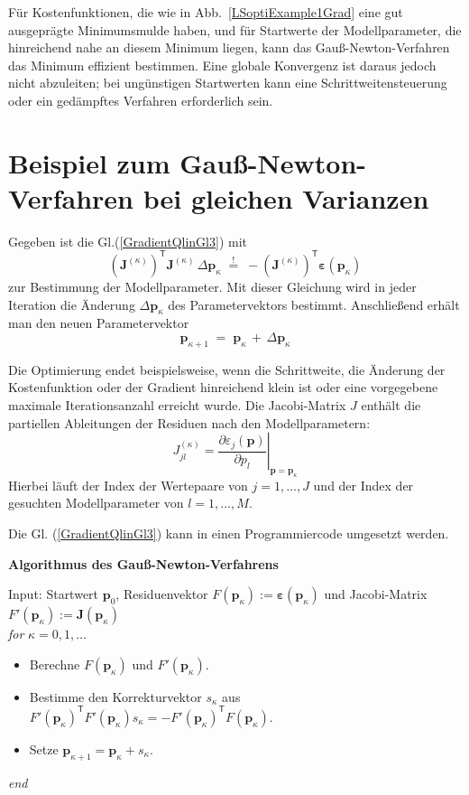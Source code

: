 Für Kostenfunktionen, die wie in Abb.~\ref{LSoptiExample1Grad} eine gut ausgeprägte
Minimumsmulde haben, und für Startwerte der Modellparameter, die hinreichend nahe an
diesem Minimum liegen, kann das Gauß-Newton-Verfahren das Minimum effizient bestimmen.
Eine globale Konvergenz ist daraus jedoch nicht abzuleiten; bei ungünstigen Startwerten
kann eine Schrittweitensteuerung oder ein gedämpftes Verfahren erforderlich sein.
\section{Beispiel zum Gauß-Newton-Verfahren bei gleichen Varianzen}

Gegeben ist die Gl.(\ref{GradientQlinGl3}) mit
$$
 \left(\boldsymbol{J}^{(\kappa)}\right)^\mathsf{T}
 \boldsymbol{J}^{(\kappa)} \, \Delta \mathbf{p}_\kappa
\; \overset{!}{=} \;
-\left(\boldsymbol{J}^{(\kappa)}\right)^\mathsf{T}
\boldsymbol{\varepsilon}(\mathbf{p}_\kappa)
$$
zur Bestimmung der Modellparameter. Mit dieser Gleichung wird in jeder Iteration
die Änderung $\Delta \mathbf{p}_\kappa$ des Parametervektors bestimmt. Anschließend
erhält man den neuen Parametervektor
$$
\mathbf{p}_{\kappa+1} \; = \; \mathbf{p}_{\kappa} \, + \,
\Delta \mathbf{p}_{\kappa}
$$

Die Optimierung endet beispielsweise, wenn die Schrittweite, die Änderung der
Kostenfunktion oder der Gradient hinreichend klein ist oder eine vorgegebene
maximale Iterationsanzahl erreicht wurde. Die Jacobi-Matrix $J$ enthält die
partiellen Ableitungen der Residuen nach den Modellparametern:
$$ 
J_{jl}^{(\kappa)}
=\left.\frac{\partial \varepsilon_j(\boldsymbol p)}
{\partial p_l}\right|_{\boldsymbol p=\boldsymbol p_\kappa}
$$
Hierbei läuft der Index der Wertepaare von $j=1,\ldots,J$  und der Index
der gesuchten Modellparameter von $l=1,\ldots,M$.

Die Gl. (\ref{GradientQlinGl3}) kann in einen Programmiercode
umgesetzt werden.

\textbf{Algorithmus des Gauß-Newton-Verfahrens}

Input: Startwert $\boldsymbol p_0$, Residuenvektor
$F(\boldsymbol p_\kappa):=\boldsymbol\varepsilon(\boldsymbol p_\kappa)$ und
Jacobi-Matrix $F'(\boldsymbol p_\kappa):=\boldsymbol J(\boldsymbol p_\kappa)$ \\
\hspace*{1em}\textit{for} $\kappa = 0,1, \ldots$ \\[-3ex]
\begin{itemize}
	\item[i)] Berechne $F(\boldsymbol p_\kappa)$ und $F'(\boldsymbol p_\kappa)$.
	\item[ii)] Bestimme den Korrekturvektor $s_\kappa$ aus
	$F'(\boldsymbol p_\kappa)^\mathsf{T}F'(\boldsymbol p_\kappa)s_\kappa
	= -F'(\boldsymbol p_\kappa)^\mathsf{T}F(\boldsymbol p_\kappa)$.
	\item[iii)] Setze $\boldsymbol p_{\kappa+1}=\boldsymbol p_\kappa+s_\kappa$.
\end{itemize}
\hspace*{1em}\textit{end} \\

